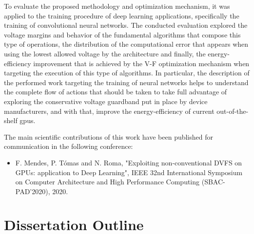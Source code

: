 To evaluate the proposed methodology and optimization mechanism, it was applied to the training procedure of deep learning applications, specifically the training of convolutional neural networks. The conducted evaluation explored the voltage margins and behavior of the fundamental algorithms that compose this type of operations, the distribution of the computational error that appears when using the lowest allowed voltage by the architecture and finally, the energy-efficiency improvement that is achieved by the V-F optimization mechanism when targeting the execution of this type of algorithms. In particular, the description of the performed work targeting the training of neural networks helps to understand the complete flow of actions that should be taken to take full advantage of exploring the conservative voltage guardband put in place by device manufacturers, and with that, improve the energy-efficiency of current out-of-the-shelf \acrshort{gpu}s.

The main scientiﬁc contributions of this work have been published for communication in the following conference:

\begin{itemize}
    \item F. Mendes, P. Tómas and N. Roma, "Exploiting non-conventional DVFS on GPUs: application to Deep Learning", IEEE 32nd International Symposium on Computer Architecture and High Performance Computing (SBAC-PAD'2020), 2020.
\end{itemize}


\section{Dissertation Outline}
\label{section:outline}

